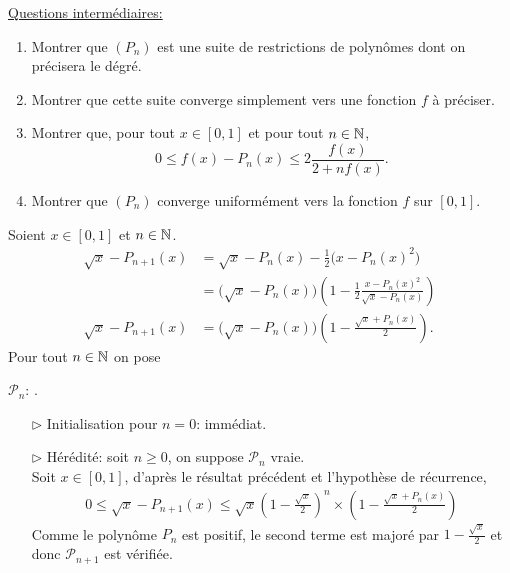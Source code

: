 \underline{Questions intermédiaires:} \\
\begin{enumerate}
    \item Montrer que $(P_n)$ est une suite de restrictions de polynômes dont on précisera le dégré.
    \item Montrer que cette suite converge simplement vers une fonction $f$ à préciser.
    \item Montrer que, pour tout $x \in [0, 1]$ et pour tout $n \in \mathbb{N}$,
    $$0 \leqslant f(x) - P_n(x) \leqslant 2 \frac{f(x)}{2 + nf(x)}.$$
    \item Montrer que $(P_n)$ converge uniformément vers la fonction $f$ sur $[0, 1]$.
\end{enumerate}

\begin{solution}
    Soient $x \in [0, 1]$ et $n \in \mathbb{N}$.
    \begin{align*}
        \sqrt{x} - P_{n+1}(x) &= \sqrt{x} - P_n(x) - \frac{1}{2} \big( x - P_n(x)^2  \big) \\
        &= \big(\sqrt{x} - P_n(x) \big) \left( 1 - \frac{1}{2} \frac{x - P_n(x)^2}{\sqrt{x} - P_n(x)} \right) \\
        \sqrt{x} - P_{n+1}(x) &= \big(\sqrt{x} - P_n(x) \big) \left(1 - \frac{\sqrt{x} + P_n(x)}{2} \right).
    \end{align*}
    Pour tout $n \in \mathbb{N}$ on pose
    \begin{center}
        $\mathscr{P}_n$: .
    \end{center}
    \begin{itemize}
        \item[$\rhd$] Initialisation pour $n = 0$: immédiat.
        \item[$\rhd$] Hérédité: soit $n \geqslant 0$, on suppose $\mathscr{P}_n$ vraie. \\
        Soit $x \in [0, 1]$, d'après le résultat précédent et l'hypothèse de récurrence,
        \begin{align*}
            0 \leqslant \sqrt{x} - P_{n+1}(x) \leqslant \sqrt{x} \left( 1 - \frac{\sqrt{x}}{2}  \right)^n \times \left(1 - \frac{\sqrt{x} + P_n(x)}{2} \right)
        \end{align*}
        Comme le polynôme $P_n$ est positif, le second terme est majoré par $1 - \frac{\sqrt{x}}{2}$ et donc $\mathscr{P}_{n+1}$ est vérifiée.
    \end{itemize}
\end{solution}


